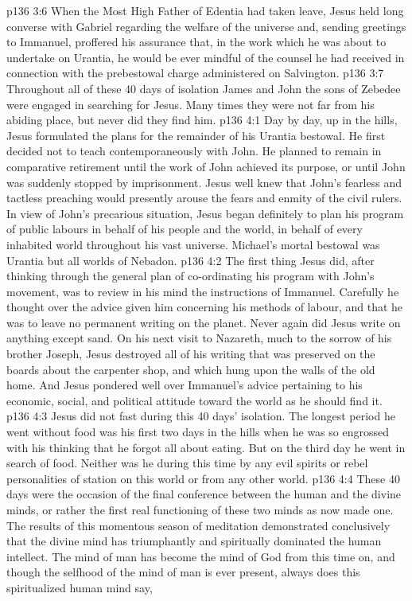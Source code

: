 \vs p136 3:6 When the Most High Father of Edentia had taken leave, Jesus held long converse with Gabriel regarding the welfare of the universe and, sending greetings to Immanuel, proffered his assurance that, in the work which he was about to undertake on Urantia, he would be ever mindful of the counsel he had received in connection with the prebestowal charge administered on Salvington.
\vs p136 3:7 \pc Throughout all of these 40 days of isolation James and John the sons of Zebedee were engaged in searching for Jesus. Many times they were not far from his abiding place, but never did they find him.
\vs p136 4:1 Day by day, up in the hills, Jesus formulated the plans for the remainder of his Urantia bestowal. He first decided not to teach contemporaneously with John. He planned to remain in comparative retirement until the work of John achieved its purpose, or until John was suddenly stopped by imprisonment. Jesus well knew that John’s fearless and tactless preaching would presently arouse the fears and enmity of the civil rulers. In view of John’s precarious situation, Jesus began definitely to plan his program of public labours in behalf of his people and the world, in behalf of every inhabited world throughout his vast universe. Michael’s mortal bestowal was  Urantia but  all worlds of Nebadon.
\vs p136 4:2 The first thing Jesus did, after thinking through the general plan of co\hyp{}ordinating his program with John’s movement, was to review in his mind the instructions of Immanuel. Carefully he thought over the advice given him concerning his methods of labour, and that he was to leave no permanent writing on the planet. Never again did Jesus write on anything except sand. On his next visit to Nazareth, much to the sorrow of his brother Joseph, Jesus destroyed all of his writing that was preserved on the boards about the carpenter shop, and which hung upon the walls of the old home. And Jesus pondered well over Immanuel’s advice pertaining to his economic, social, and political attitude toward the world as he should find it.
\vs p136 4:3 \pc Jesus did not fast during this 40 days’ isolation. The longest period he went without food was his first two days in the hills when he was so engrossed with his thinking that he forgot all about eating. But on the third day he went in search of food. Neither was he  during this time by any evil spirits or rebel personalities of station on this world or from any other world.
\vs p136 4:4 \pc These 40 days were the occasion of the final conference between the human and the divine minds, or rather the first real functioning of these two minds as now made one. The results of this momentous season of meditation demonstrated conclusively that the divine mind has triumphantly and spiritually dominated the human intellect. The mind of man has become the mind of God from this time on, and though the selfhood of the mind of man is ever present, always does this spiritualized human mind say, 
